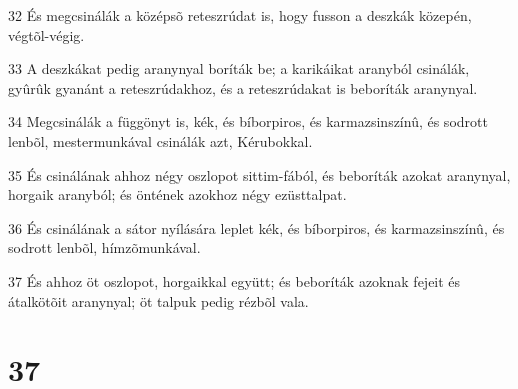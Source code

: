 \par 32 És megcsinálák a középsõ reteszrúdat is, hogy fusson a deszkák közepén, végtõl-végig.
\par 33 A deszkákat pedig aranynyal boríták be; a karikáikat aranyból csinálák, gyûrûk gyanánt a reteszrúdakhoz, és a reteszrúdakat is beboríták aranynyal.
\par 34 Megcsinálák a függönyt is, kék, és bíborpiros, és karmazsinszínû, és sodrott lenbõl, mestermunkával csinálák azt, Kérubokkal.
\par 35 És csinálának ahhoz négy oszlopot sittim-fából, és beboríták azokat aranynyal, horgaik aranyból; és öntének azokhoz négy ezüsttalpat.
\par 36 És csinálának a sátor nyílására leplet kék, és bíborpiros, és karmazsinszínû, és sodrott lenbõl, hímzõmunkával.
\par 37 És ahhoz öt oszlopot, horgaikkal együtt; és beboríták azoknak fejeit és átalkötõit aranynyal; öt talpuk pedig rézbõl vala.

\chapter{37}

